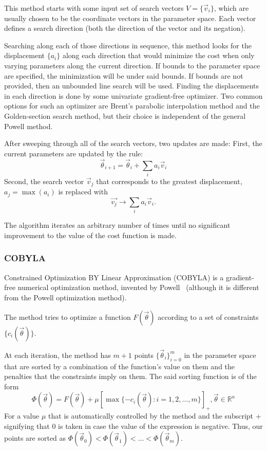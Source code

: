 \documentclass[a4paper,12pt]{article}
\newcommand{\thetas}{\vec{\theta}}
\begin{document}
This method starts with some input set of search vectors $V = \{\vec{v}_i\}$, which are usually chosen to be the coordinate vectors in the parameter space. Each vector defines a search direction (both the direction of the vector and its negation).

Searching along each of those directions in sequence, this method looks for the displacement $\{a_i\}$ along each direction that would minimize the cost when only varying parameters along the current direction.
If bounds to the parameter space are specified, the minimization will be under said bounds. If bounds are not provided, then an unbounded line search will be used.
Finding the displacements in each direction is done by some univariate gradient-free optimizer.
Two common options for such an optimizer are Brent's parabolic interpolation method and the Golden-section search method, but their choice is independent of the general Powell method.

After sweeping through all of the search vectors, two updates are made:
First, the current parameters are updated by the rule:
\begin{equation}
    \thetas_{i+1} = \thetas_{i} + \sum_i a_i \vec{v}_i
\end{equation}
Second, the search vector $\vec{v}_j$ that corresponds to the greatest displacement, $a_j = \max(a_i)$ is replaced with
\begin{equation}
    \vec{v_j} \to \sum_i a_i \vec{v}_i.
\end{equation}

The algorithm iterates an arbitrary number of times until no significant improvement to the value of the cost function is made.


\subsubsection{COBYLA}
Constrained Optimization BY Linear Approximation (COBYLA) is a gradient-free numerical optimization method, invented by Powell~\cite{Powell1994,powell_view_2007} (although it is different from the Powell optimization method).

The method tries to optimize a function $F(\thetas)$ according to a set of constraints $\{c_i(\thetas)\}$.

At each iteration, the method has $m+1$ points $\{\thetas_i\}_{i=0}^m$ in the parameter space that are sorted by a combination of the function's value on them and the penalties that the constraints imply on them.
The said sorting function is of the form
\begin{equation}
    \Phi(\thetas) = F(\thetas) + \mu[ \max\{-c_i(\thetas) : i=1,2,\dots,m \} ]_+, \thetas \in \mathbb{R}^n
\end{equation}
For a value $\mu$ that is automatically controlled by the method and the subscript + signifying that 0 is taken in case the value of the expression is negative.
Thus, our points are sorted as $\Phi(\thetas_0) < \Phi(\thetas_1) < \dots < \Phi(\thetas_m)$.
\end{document}
